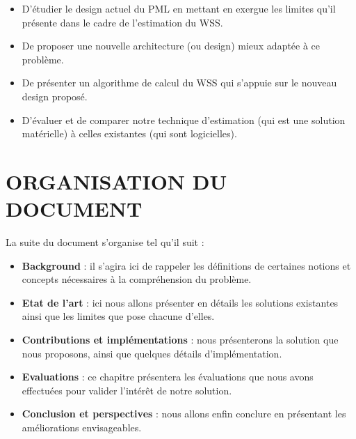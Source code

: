 \begin{itemize}[label=, font=\large \color{darkorange}]
    \item D'étudier le design actuel du PML en mettant en exergue les limites qu'il présente dans le cadre de l'estimation du WSS.
    \item De proposer une nouvelle architecture (ou design) mieux adaptée à ce problème.
    \item De présenter un algorithme de calcul du WSS qui s'appuie sur le nouveau design proposé.
    \item D'évaluer et de comparer notre technique d'estimation (qui est une solution matérielle) à celles existantes (qui sont logicielles).
\end{itemize}

\section*{ORGANISATION DU DOCUMENT}
La suite du document s'organise tel qu'il suit : 
\begin{itemize}[label=, font=\large \color{darkorange}]
    \item \textbf{Background} : il s'agira ici de rappeler les définitions de certaines notions et concepts nécessaires à la compréhension du problème.
    \item \textbf{Etat de l'art} : ici nous allons présenter en détails les solutions existantes ainsi que les limites que pose chacune d'elles.
    \item \textbf{Contributions et implémentations} : nous présenterons la solution que nous proposons, ainsi que quelques détails d’implémentation.
    \item \textbf{Evaluations} : ce chapitre présentera les évaluations que nous avons effectuées pour valider l’intérêt de notre solution.
    \item \textbf{Conclusion et perspectives } : nous allons enfin conclure en présentant les améliorations envisageables.
\end{itemize}

